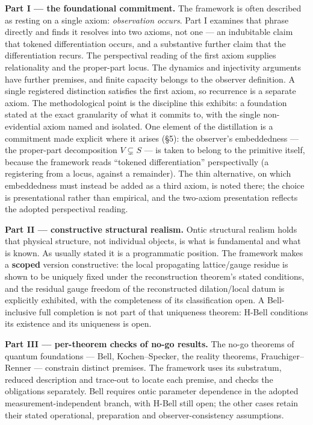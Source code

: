 \documentclass[
]{article}
\begin{document}
\textbf{Part I --- the foundational commitment.} The framework is often
described as resting on a single axiom: \emph{observation occurs}. Part
I examines that phrase directly and finds it resolves into two axioms,
not one --- an indubitable claim that tokened differentiation occurs,
and a substantive further claim that the differentiation recurs. The
perspectival reading of the first axiom supplies relationality and the
proper-part locus. The dynamics and injectivity arguments have further
premises, and finite capacity belongs to the observer definition. A
single registered distinction satisfies the first axiom, so recurrence
is a separate axiom. The methodological point is the discipline this
exhibits: a foundation stated at the exact granularity of what it
commits to, with the single non-evidential axiom named and isolated. One
element of the distillation is a commitment made explicit where it
arises (§5): the observer's embeddedness --- the proper-part
decomposition \(V \subsetneq S\) --- is taken to belong to the primitive
itself, because the framework reads ``tokened differentiation''
perspectivally (a registering from a locus, against a remainder). The
thin alternative, on which embeddedness must instead be added as a third
axiom, is noted there; the choice is presentational rather than
empirical, and the two-axiom presentation reflects the adopted
perspectival reading.

\textbf{Part II --- constructive structural realism.} Ontic structural
realism holds that physical structure, not individual objects, is what
is fundamental and what is known. As usually stated it is a programmatic
position. The framework makes a \textbf{scoped} version constructive:
the local propagating lattice/gauge residue is shown to be uniquely
fixed under the reconstruction theorem's stated conditions, and the
residual gauge freedom of the reconstructed dilation/local datum is
explicitly exhibited, with the completeness of its classification open.
A Bell-inclusive full completion is not part of that uniqueness theorem:
H-Bell conditions its existence and its uniqueness is open.

\textbf{Part III --- per-theorem checks of no-go results.} The no-go
theorems of quantum foundations --- Bell, Kochen--Specker, the reality
theorems, Frauchiger--Renner --- constrain distinct premises. The
framework uses its substratum, reduced description and trace-out to
locate each premise, and checks the obligations separately. Bell
requires ontic parameter dependence in the adopted
measurement-independent branch, with H-Bell still open; the other cases
retain their stated operational, preparation and observer-consistency
assumptions.
\end{document}
